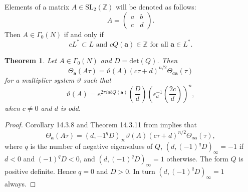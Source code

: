\documentclass[11pt,a4paper]{amsart}
\newtheorem{theorem}{Theorem}[section]
\theoremstyle{definition}
\newcommand{\SZ}{\mathbb{Z}}                    %
\begin{document}
Elements of a matrix $A \in \mathrm{SL}_2(\SZ)$ will be denoted as follows:
\begin{equation}
\label{eq:matrix}
A=\begin{pmatrix}
a & b \\ c & d
\end{pmatrix}.\end{equation}
Then $A \in \Gamma_0(N)$ if and only if
\[  cL^{\ast} \subset L \textrm{ and } cQ(\mathbf{a}) \in \SZ \textrm{ for all } \mathbf{a} \in L^{\ast}. \]

\begin{theorem} 
\label{thm:modthm}
	Let $A \in \Gamma_0(N)$ and  $D = \mathrm{det}(Q)$.
	Then
	\[ \Theta_{\mathbf{a}}(A\tau)= \vartheta(A)(c\tau+d)^{n/2} \Theta_{a\mathbf{a}}(\tau) \]
	for a multiplier system $\vartheta$ such that
	\[ \vartheta(A)=e^{2 \pi i ab Q(\mathbf{a})} \left(\frac{D}{d}\right)\left(\epsilon^{-1}_d \left(\frac{2c}{d}\right)\right)^n, \]
	when $c \neq 0$ and $d$ is odd.
\end{theorem}
\begin{proof}
	Corollary 14.3.8 and Theorem 14.3.11 from \cite{cohen2017modular} implies that
	\[ \Theta_{\mathbf{a}}(A\tau)= (d,-1^{q}D)_{\infty}\vartheta(A)(c\tau+d)^{n/2} \Theta_{a\mathbf{a}}(\tau), \]
	where $q$ is the number of negative eigenvalues of $Q$, $(d,(-1)^{q}D)_{\infty}= -1$ if $d<0$ and $(-1)^{q}D < 0$, and $(d,(-1)^{q}D)_{\infty}= 1$ otherwise. The form $Q$ is positive definite. Hence $q=0$ and $D>0$. In turn $(d,(-1)^{q}D)_{\infty}= 1$ always.
	
\end{proof}
\end{document}
